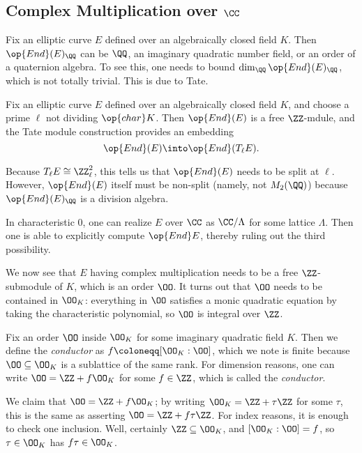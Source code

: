 \documentclass[../notes.tex]{subfiles}
\begin{document}
\subsection{Complex Multiplication over \texorpdfstring{$\CC$}{C}}
Fix an elliptic curve $E$ defined over an algebraically closed field $K$. Then $\op{End}(E)_\QQ$ can be $\QQ$, an imaginary quadratic number field, or an order of a quaternion algebra. To see this, one needs to bound $\dim_\QQ\op{End}(E)_\QQ$, which is not totally trivial. This is due to Tate.
\begin{theorem}[Tate]
	Fix an elliptic curve $E$ defined over an algebraically closed field $K$, and choose a prime $\ell$ not dividing $\op{char}K$. Then $\op{End}(E)$ is a free $\ZZ$-mdule, and the Tate module construction provides an embedding
	\[\op{End}(E)\into\op{End}(T_\ell E).\]
\end{theorem}
\begin{remark}	
	Because $T_\ell E\cong\ZZ_\ell^2$, this tells us that $\op{End}(E)$ needs to be split at $\ell$. However, $\op{End}(E)$ itself must be non-split (namely, not $M_2(\QQ)$) because $\op{End}(E)_\QQ$ is a division algebra.
\end{remark}
\begin{remark}
	In characteristic $0$, one can realize $E$ over $\CC$ as $\CC/\Lambda$ for some lattice $\Lambda$. Then one is able to explicitly compute $\op{End}E$, thereby ruling out the third possibility.
\end{remark}
We now see that $E$ having complex multiplication needs to be a free $\ZZ$-submodule of $K$, which is an order $\OO$. It turns out that $\OO$ needs to be contained in $\OO_K$: everything in $\OO$ satisfies a monic quadratic equation by taking the characteristic polynomial, so $\OO$ is integral over $\ZZ$.
\begin{definition}[conductor]
	Fix an order $\OO$ inside $\OO_K$ for some imaginary quadratic field $K$. Then we define the \textit{conductor} as $f\coloneqq[\OO_K:\OO]$, which we note is finite because $\OO\subseteq\OO_K$ is a sublattice of the same rank. For dimension reasons, one can write $\OO=\ZZ+f\OO_K$ for some $f\in\ZZ$, which is called the \textit{conductor}.
\end{definition}
\begin{remark}
	We claim that $\OO=\ZZ+f\OO_K$; by writing $\OO_K=\ZZ+\tau\ZZ$ for some $\tau$, this is the same as asserting $\OO=\ZZ+f\tau\ZZ$. For index reasons, it is enough to check one inclusion. Well, certainly $\ZZ\subseteq\OO_K$, and $[\OO_K:\OO]=f$, so $\tau\in\OO_K$ has $f\tau\in\OO_K$.
\end{remark}
\end{document}
